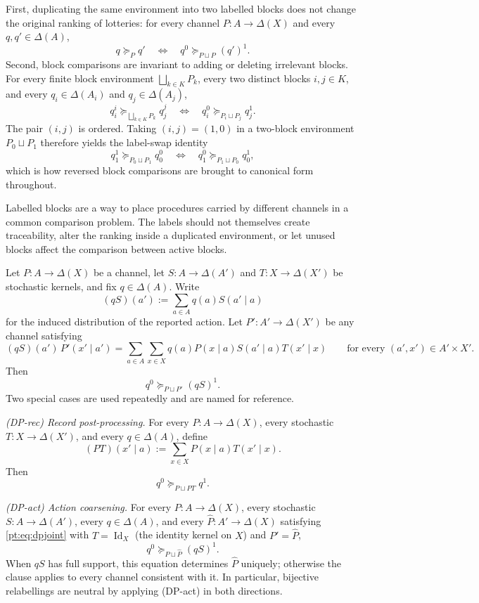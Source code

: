 \documentclass[11pt,a4paper]{article}
\theoremstyle{definition}
\newcommand{\Id}{\operatorname{Id}}
\newcommand{\1}{\mathbf 1}
\begin{document}
\begin{description}[leftmargin=*,style=sameline]
\item[(P3) Block-comparison coherence.]
First, duplicating the same environment into two labelled blocks does not change the original ranking of lotteries:
for every channel $P:A\to\Delta(X)$ and every $q,q'\in\Delta(A)$,
\[
q\succeq_P q'
\quad\Longleftrightarrow\quad
q^0\succeq_{P\sqcup P}(q')^1.
\]
Second, block comparisons are invariant to adding or deleting irrelevant blocks.  For every finite block environment
$\bigsqcup_{k\in K}P_k$, every two distinct blocks $i,j\in K$, and every
$q_i\in\Delta(A_i)$ and $q_j\in\Delta(A_j)$,
\[
q_i^i\succeq_{\bigsqcup_{k\in K}P_k}q_j^j
\quad\Longleftrightarrow\quad
q_i^0\succeq_{P_i\sqcup P_j}q_j^1.
\]
The pair $(i,j)$ is ordered.  Taking $(i,j)=(1,0)$ in a two-block environment $P_0\sqcup P_1$ therefore yields the
label-swap identity
\[
q_1^1\succeq_{P_0\sqcup P_1}q_0^0
\quad\Longleftrightarrow\quad
q_1^0\succeq_{P_1\sqcup P_0}q_0^1,
\]
which is how reversed block comparisons are brought to canonical form throughout.

Labelled blocks are a way to place procedures carried by different channels in a common comparison problem.  The labels
should not themselves create traceability, alter the ranking inside a duplicated environment, or let unused blocks affect
the comparison between active blocks.

\item[(P4) Data-processing aversion.]
Let $P:A\to\Delta(X)$ be a channel, let $S:A\to\Delta(A')$ and $T:X\to\Delta(X')$ be stochastic kernels, and fix
$q\in\Delta(A)$.  Write
\[
(qS)(a'):=\sum_{a\in A}q(a)S(a'\mid a)
\]
for the induced distribution of the reported action.  Let $P':A'\to\Delta(X')$ be any
channel satisfying
\begin{equation}
(qS)(a')\,P'(x'\mid a')
=
\sum_{a\in A}\sum_{x\in X}q(a)P(x\mid a)S(a'\mid a)T(x'\mid x)
\qquad\text{for every }(a',x')\in A'\times X'.
\tag{DP}\label{pt:eq:dpjoint}
\end{equation}
Then
\[
q^0\succeq_{P\sqcup P'}(qS)^1.
\]
Two special cases are used repeatedly and are named for reference.

\emph{\textup{(DP-rec)} Record post-processing.}  For every $P:A\to\Delta(X)$, every stochastic $T:X\to\Delta(X')$, and
every $q\in\Delta(A)$, define
\[
(PT)(x'\mid a):=\sum_{x\in X}P(x\mid a)T(x'\mid x).
\]
Then
\[
q^0\succeq_{P\sqcup PT}q^1.
\]

\emph{\textup{(DP-act)} Action coarsening.}  For every $P:A\to\Delta(X)$, every stochastic $S:A\to\Delta(A')$, every
$q\in\Delta(A)$, and every $\widehat P:A'\to\Delta(X)$ satisfying \eqref{pt:eq:dpjoint} with $T=\Id_X$ (the identity
kernel on $X$) and $P'=\widehat P$,
\[
q^0\succeq_{P\sqcup \widehat P}(qS)^1.
\]
When $qS$ has full support, this equation determines $\widehat P$ uniquely; otherwise the clause applies to every channel
consistent with it.  In particular, bijective relabellings are neutral by applying \textup{(DP-act)} in both directions.


\end{description}
\end{document}
